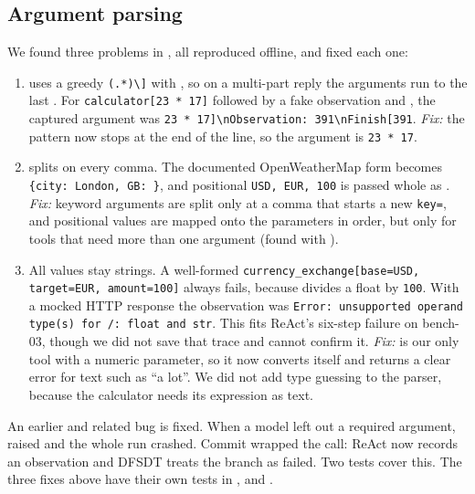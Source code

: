 \documentclass[conference,a4paper]{IEEEtran}
\begin{document}
\subsection{Argument parsing}\label{sec:args}
We found three problems in , all reproduced
offline, and fixed each one:
\begin{enumerate}\raggedright
  \item {} uses a greedy \texttt{(.*)\textbackslash]}
        with , so on a multi-part reply the arguments run to
        the last \code{]}. For \texttt{calculator[23 * 17]} followed by a
        fake observation and , the captured argument was
        \texttt{23 * 17]\textbackslash nObservation: 391\textbackslash nFinish[391}.
        \emph{Fix:} the pattern now stops at the end of the line, so the
        argument is \texttt{23 * 17}.
  \item {} splits on every comma. The documented
        OpenWeatherMap form  becomes
        \texttt{\{\textquotesingle{}city\textquotesingle{}: \textquotesingle{}London\textquotesingle{}, \textquotesingle{}GB\textquotesingle{}: \textquotesingle{}\textquotesingle{}\}}, and positional
        \texttt{USD, EUR, 100} is passed whole as .
        \emph{Fix:} keyword arguments are split only at a comma that
        starts a new \texttt{key=}, and positional values are mapped onto
        the parameters in order, but only for tools that need more than
        one argument (found with ).
  \item All values stay strings. A well-formed
        \texttt{currency\_exchange[base=USD, target=EUR, amount=100]}
        always fails, because  divides a
        float by \texttt{\textquotesingle{}100\textquotesingle{}}. With a mocked HTTP response the observation
        was \texttt{Error: unsupported operand type(s) for /: \textquotesingle{}float\textquotesingle{} and
        \textquotesingle{}str\textquotesingle{}}. This fits ReAct's six-step failure on bench-03, though we
        did not save that trace and cannot confirm it. \emph{Fix:}
         is our only tool with a numeric
        parameter, so it now converts  itself and returns
        a clear error for text such as ``a lot''. We did not add type
        guessing to the parser, because the calculator needs its
        expression as text.
\end{enumerate}
An earlier and related bug is fixed. When a model left out a required
argument,  raised  and the whole
run crashed. Commit  wrapped the call: ReAct now records an
 observation and DFSDT treats the branch as failed. Two tests
cover this. The three fixes above have their own tests in
,  and
.
\end{document}
